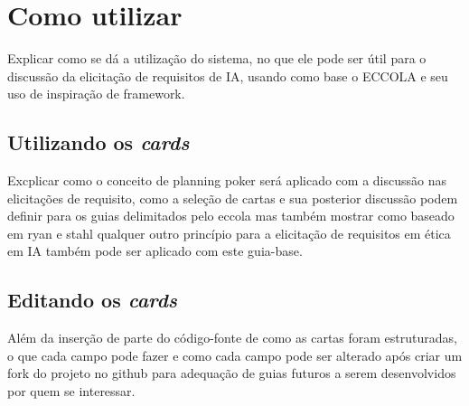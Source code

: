 \section{Como utilizar}
Explicar como se dá a utilização do sistema, no que ele pode ser útil para o discussão da elicitação de requisitos de IA, usando como base o ECCOLA e seu uso de inspiração de framework. 
\subsection{Utilizando os \textit{cards}}
Excplicar como o conceito de planning poker será aplicado com a discussão nas elicitações de requisito, como a seleção de cartas e sua posterior discussão podem definir para os guias delimitados pelo eccola mas também mostrar como baseado em ryan e stahl qualquer outro princípio para a elicitação de requisitos em ética em IA também pode ser aplicado com este guia-base.
\subsection{Editando os \textit{cards}}
Além da inserção de parte do código-fonte de como as cartas foram estruturadas, o que cada campo pode fazer e como cada campo pode ser alterado após criar um fork do projeto no github para adequação de guias futuros a serem desenvolvidos por quem se interessar.
